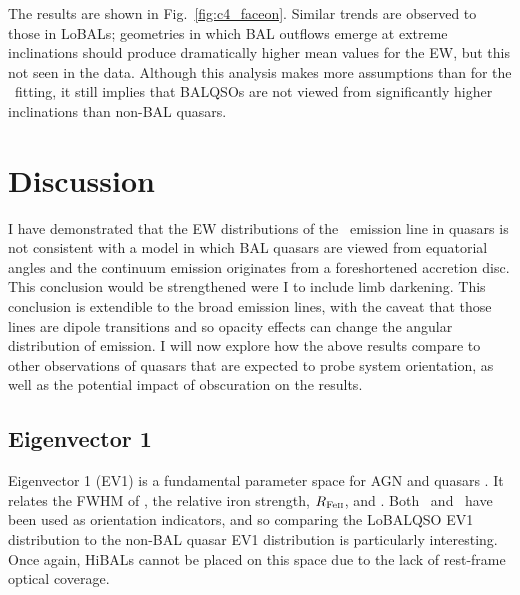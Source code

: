The results are shown in Fig.~\ref{fig:c4_faceon}. 
Similar trends are observed to those in LoBALs; geometries
in which BAL outflows emerge at extreme inclinations should produce
dramatically higher mean values for the EW, but this not seen in 
the data. Although this analysis makes more assumptions than for the \ewo\
fitting, it still implies that BALQSOs are not viewed from significantly 
higher inclinations than non-BAL quasars.


\section{Discussion}
\label{sec:discuss_ew}
I have demonstrated that the EW distributions of the 
\oiiifull\ emission line in quasars is not consistent with a 
model in which BAL quasars are viewed from equatorial angles 
and the continuum emission originates from
a foreshortened accretion disc. This conclusion would be strengthened were 
I to include limb darkening. This conclusion is extendible to the broad 
emission lines, with the caveat that those lines are dipole 
transitions and so opacity effects can change the angular distribution of 
emission. I will now explore how the above results compare to other
observations of quasars that are expected to probe system orientation, as 
well as the potential impact of obscuration on the results.

\subsection{Eigenvector 1}


Eigenvector 1 (EV1) is a fundamental parameter space for AGN and quasars
\citep{borosongreen,sulentic2000ev1,marziani2001,shenho2014}. 
It relates the FWHM of \hb, the relative iron strength, 
$R_{{\rm Fe \textsc{ii}}}$, and
\ewo. Both \ewo\ and \fwh\ have been used as orientation
indicators, and so comparing the LoBALQSO EV1 distribution to the non-BAL 
quasar EV1 distribution is particularly interesting. Once again,
HiBALs cannot be placed on this space due to the lack of rest-frame 
optical coverage.

